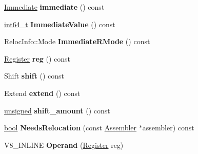 \begin{DoxyCompactItemize}
\item 
\mbox{\label{classv8_1_1internal_1_1Operand_af73702a23c76397b9a5486c0f1505e4e}} 
\mbox{\hyperlink{classv8_1_1internal_1_1Immediate}{Immediate}} {\bfseries immediate} () const
\item 
\mbox{\label{classv8_1_1internal_1_1Operand_a51a7d5eaf3952758e6f50389917ef998}} 
\mbox{\hyperlink{classint64__t}{int64\+\_\+t}} {\bfseries Immediate\+Value} () const
\item 
\mbox{\label{classv8_1_1internal_1_1Operand_a6a702ba2ac4863abc2073045bc944faa}} 
Reloc\+Info\+::\+Mode {\bfseries Immediate\+R\+Mode} () const
\item 
\mbox{\label{classv8_1_1internal_1_1Operand_a2a80076be6d84a6030e554639c2e3dae}} 
\mbox{\hyperlink{classv8_1_1internal_1_1Register}{Register}} {\bfseries reg} () const
\item 
\mbox{\label{classv8_1_1internal_1_1Operand_a539d14d89c286675f3e02677aa7c9a69}} 
Shift {\bfseries shift} () const
\item 
\mbox{\label{classv8_1_1internal_1_1Operand_aea48644e681324f0a0988d6feb8dfbbe}} 
Extend {\bfseries extend} () const
\item 
\mbox{\label{classv8_1_1internal_1_1Operand_a8bd31cadc708d33be85ae56d9452e3d7}} 
\mbox{\hyperlink{classunsigned}{unsigned}} {\bfseries shift\+\_\+amount} () const
\item 
\mbox{\label{classv8_1_1internal_1_1Operand_a9fd0146fb876fdaf66d7b6ae43901371}} 
\mbox{\hyperlink{classbool}{bool}} {\bfseries Needs\+Relocation} (const \mbox{\hyperlink{classv8_1_1internal_1_1Assembler}{Assembler}} $\ast$assembler) const
\item 
\mbox{\label{classv8_1_1internal_1_1Operand_aff3d3418ff786b40afec32f1a7e63a96}} 
V8\+\_\+\+I\+N\+L\+I\+NE {\bfseries Operand} (\mbox{\hyperlink{classv8_1_1internal_1_1Register}{Register}} reg)

\end{DoxyCompactItemize}
